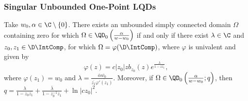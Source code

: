 \documentclass{article}
\numberwithin{equation}{section}
\begin{document}
\subsubsection{Singular Unbounded One-Point LQDs}\label{subsubsec:LOGWQDUnboundedOnePtZ}



\begin{theorem}\label{thm:UnboundedSingularOnePtLQD}
Take $w_0,\alpha\in\C\setminus\{0\}$. There exists an unbounded simply connected domain $\Omega$ containing zero for which $\Omega\in\QD_0\left(\frac{\alpha}{w-w_0}\right)$ if and only if there exist $\lambda\in\C$ and $z_0,z_1\in\D\IntComp$, for which $\Omega=\varphi(\D\IntComp)$, where $\varphi$ is univalent and given by
\begin{equation}\label{eqn:UnboundedSingularOnePtLQD}
    \varphi(z)=c|z_0|zb_{z_0}(z)e^{\frac{\lambda}{1-z\overline{z_1}}},
\end{equation}
where $\varphi(z_1)=w_0$ and $\lambda=\frac{\overline{\alpha}\overline{w_0}}{\overline{z_1}\overline{\varphi'(z_1)}}$. Moreover, if $\Omega\in\QD_0\left(\frac{\alpha}{w-w_0};q\right)$, then $q=\frac{\lambda}{1-z_0\overline{z_1}}+\frac{\overline{\lambda}}{1-z_0^{-1}z_1}+\ln|cz_0|^2$.
\end{theorem}
\end{document}
